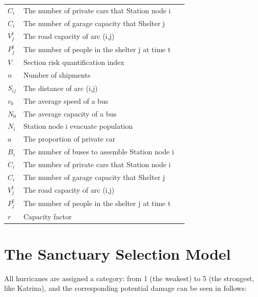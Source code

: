 \documentclass{mcmthesis}
\begin{document}
\begin{center}
\begin{longtable}{p{}p{}m{}}
    $C_i$            & The number of private cars that Station node i                            \\
    $C_i$            & The number of garage capacity that Shelter j                              \\
    $V_j^t$          & The road capacity of arc (i,j)                                            \\
    $P_j^t$          & The number of people in the shelter j at time t                           \\
    $V$              & Section risk quantification index                                         \\
    $n$              & Number of shipments                                                       \\
    $S_{ij}$         & The distance of arc (i,j)                                                 \\
    $v_b$            & The average speed of a bus                                                \\
    $N_0$            & The average capacity of a bus                                             \\
    $N_i$            & Station node i evacuate population                                        \\
    $a$              & The proportion of private car                                             \\
    $B_i$            & The number of buses to assemble Station node i                            \\
    $C_i$            & The number of private cars that Station node i                            \\
    $C_i$            & The number of garage capacity that Shelter j                              \\
    $V_j^t$          & The road capacity of arc (i,j)                                            \\
    $P_j^t$          & The number of people in the shelter j at time t                           \\
    $r$              & Capacity factor                                                           \\ \hline
  \end{longtable}
\end{center}


\section{The Sanctuary Selection Model}
All hurricanes are assigned a category: from 1 (the weakest) to 5 (the strongest, like Katrina), and the corresponding potential damage can be seen in  follows:
\end{document}
